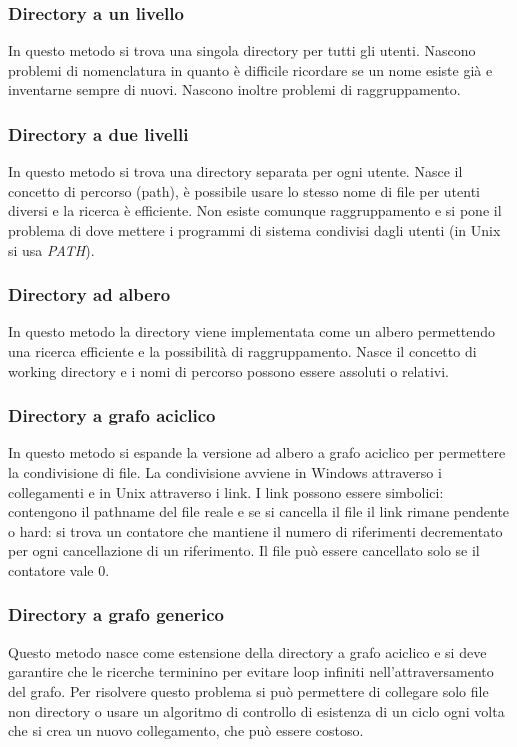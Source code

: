 \subsubsection{Directory a un livello}
In questo metodo si trova una singola directory per tutti gli utenti. Nascono problemi di nomenclatura in quanto \`e difficile ricordare se un nome esiste gi\`a e inventarne sempre di
nuovi. Nascono inoltre problemi di raggruppamento. 
\subsubsection{Directory a due livelli}
In questo metodo si trova una directory separata per ogni utente. Nasce il concetto di percorso (path), \`e possibile usare lo stesso nome di file per utenti diversi e la ricerca \`e
efficiente. Non esiste comunque raggruppamento e si pone il problema di dove mettere i programmi di sistema condivisi dagli utenti (in Unix si usa \emph{PATH}).
\subsubsection{Directory ad albero}
In questo metodo la directory viene implementata come un albero permettendo una ricerca efficiente e la possibilit\`a di raggruppamento. Nasce il concetto di working directory e i
nomi di percorso possono essere assoluti o relativi. 
\subsubsection{Directory a grafo aciclico}
In questo metodo si espande la versione ad albero a grafo aciclico per permettere la condivisione di file. La condivisione avviene in Windows attraverso i collegamenti e in Unix
attraverso i link. I link possono essere simbolici: contengono il pathname del file reale e se si cancella il file il link rimane pendente o hard: si trova un contatore che mantiene
il numero di riferimenti decrementato per ogni cancellazione di un riferimento. Il file pu\`o essere cancellato solo se il contatore vale $0$. 
\subsubsection{Directory a grafo generico}
Questo metodo nasce come estensione della directory a grafo aciclico e si deve garantire che le ricerche terminino per evitare loop infiniti nell'attraversamento del grafo. Per risolvere
questo problema si pu\`o permettere di collegare solo file non directory o usare un algoritmo di controllo di esistenza di un ciclo ogni volta che si crea un nuovo collegamento, che 
pu\`o essere costoso. 
